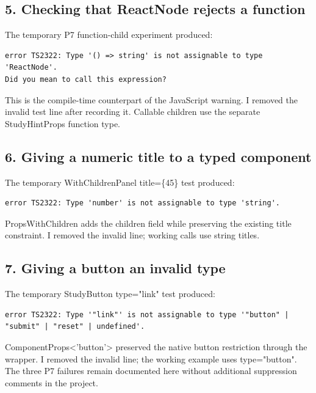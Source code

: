 \documentclass[10pt,a4paper]{article}
\begin{document}
\subsection{5. Checking that ReactNode rejects a function}


The temporary P7 function-child experiment produced:

\begin{lstlisting}[language={}]
error TS2322: Type '() => string' is not assignable to type 'ReactNode'.
Did you mean to call this expression?
\end{lstlisting}

This is the compile-time counterpart of the JavaScript warning. I removed the invalid test line after recording it. Callable children use the separate StudyHintProps function type.

\subsection{6. Giving a numeric title to a typed component}


The temporary WithChildrenPanel title=\{45\} test produced:

\begin{lstlisting}[language={}]
error TS2322: Type 'number' is not assignable to type 'string'.
\end{lstlisting}

PropsWithChildren adds the children field while preserving the existing title constraint. I removed the invalid line; working calls use string titles.

\subsection{7. Giving a button an invalid type}


The temporary StudyButton type="link" test produced:

\begin{lstlisting}[language={}]
error TS2322: Type '"link"' is not assignable to type '"button" | "submit" | "reset" | undefined'.
\end{lstlisting}

ComponentProps<'button'> preserved the native button restriction through the wrapper. I removed the invalid line; the working example uses type="button". The three P7 failures remain documented here without additional suppression comments in the project.
\end{document}
